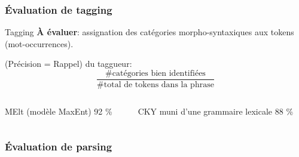 \documentclass{beamer}
\begin{document}
\begin{frame}
\frametitle{\'Evaluation de tagging}
\begin{block}{Tagging}
 \textbf{\`A \'evaluer}: assignation des cat\'egories morpho-syntaxiques aux tokens (mot-occurrences).
\end{block}
\pause
 (Pr\'ecision = Rappel) du taggueur:
$$ \frac{\# \text{cat\'egories bien identifi\'ees}}{\# \text{total de tokens dans la phrase}} $$
\pause
\begin{columns}[t]
\begin{column}{5cm}
\begin{block}{MElt (mod\`ele MaxEnt)}
92 \%
\end{block}
\end{column}
\begin{column}{5cm}
\begin{block}{CKY muni d'une grammaire lexicale}
88 \%
\end{block}
\end{column}
\end{columns}

\end{frame}


\begin{frame}
\frametitle{\'Evaluation de parsing}


\end{frame}
\end{document}
